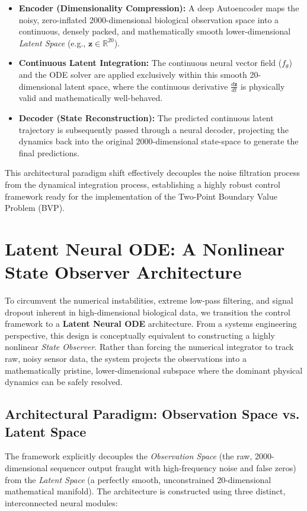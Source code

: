 \documentclass[12pt, a4paper]{article}
\begin{document}
	\begin{itemize}
		\item \textbf{Encoder (Dimensionality Compression):} A deep Autoencoder maps the noisy, zero-inflated 2000-dimensional biological observation space into a continuous, densely packed, and mathematically smooth lower-dimensional \textit{Latent Space} (e.g., $\mathbf{z} \in \mathbb{R}^{20}$).
		\item \textbf{Continuous Latent Integration:} The continuous neural vector field ($f_\theta$) and the ODE solver are applied exclusively within this smooth 20-dimensional latent space, where the continuous derivative $\frac{d\mathbf{z}}{dt}$ is physically valid and mathematically well-behaved.
		\item \textbf{Decoder (State Reconstruction):} The predicted continuous latent trajectory is subsequently passed through a neural decoder, projecting the dynamics back into the original 2000-dimensional state-space to generate the final predictions.
	\end{itemize}
	
	This architectural paradigm shift effectively decouples the noise filtration process from the dynamical integration process, establishing a highly robust control framework ready for the implementation of the Two-Point Boundary Value Problem (BVP).
	
	\section{Latent Neural ODE: A Nonlinear State Observer Architecture}
	
	To circumvent the numerical instabilities, extreme low-pass filtering, and signal dropout inherent in high-dimensional biological data, we transition the control framework to a \textbf{Latent Neural ODE} architecture. From a systems engineering perspective, this design is conceptually equivalent to constructing a highly nonlinear \textit{State Observer}. Rather than forcing the numerical integrator to track raw, noisy sensor data, the system projects the observations into a mathematically pristine, lower-dimensional subspace where the dominant physical dynamics can be safely resolved.
	
	\subsection{Architectural Paradigm: Observation Space vs. Latent Space}
	The framework explicitly decouples the \textit{Observation Space} (the raw, 2000-dimensional sequencer output fraught with high-frequency noise and false zeros) from the \textit{Latent Space} (a perfectly smooth, unconstrained 20-dimensional mathematical manifold). The architecture is constructed using three distinct, interconnected neural modules:
	
\end{document}
